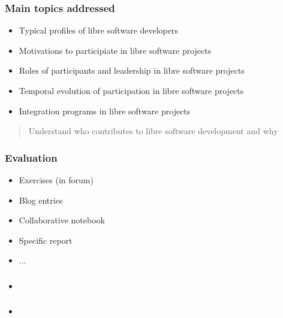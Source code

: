 \begin{frame}
\frametitle{Main topics addressed}

\begin{itemize}
\item Typical profiles of libre software developers
\item Motivations to participiate in libre software projects
\item Roles of participants and leadership in libre software projects
\item Temporal evolution of participation in libre software projects
\item Integration programs in libre software projects
\end{itemize}

\begin{quote}
\begin{center}
Understand who contributes to libre software development and why
\end{center}
\end{quote}

\end{frame}


\begin{frame}
\frametitle{Evaluation}

\begin{itemize}
\item Exercises (in forum)
\item Blog entries
\item Collaborative notebook
\item Specific report
\item ...
\end{itemize}

\end{frame}


\begin{frame}
\frametitle{}

\begin{itemize}
\item 
\end{itemize}

\end{frame}


\begin{frame}
\frametitle{}

\begin{itemize}
\item 
\end{itemize}

\end{frame}

